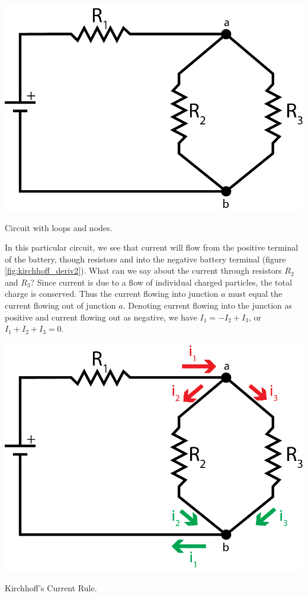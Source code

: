 \documentclass{tufte-book}
\begin{document}
\begin{marginfigure}%
  \includegraphics[width=\linewidth]{Kirchoff_I}
  \caption{Circuit with loops and nodes.}
  \label{fig:kirchhoff_deriv1}
\end{marginfigure}



In this particular circuit, we see that current will flow from the positive terminal of the battery, though resistors and into the negative battery terminal (figure \ref{fig:kirchhoff_deriv2}). What can we say about the current through resistors $R_2$ and $R_3$? Since current is due to a flow of individual charged particles, the total charge is conserved. Thus the current flowing into junction $a$ must equal the current flowing out of junction $a$. Denoting  current flowing into the junction as positive and current flowing out as negative, we have $I_1 = -I_2 + I_3$, or $I_1 + I_2 + I_3 = 0$.


\begin{marginfigure}%
  \includegraphics[width=\linewidth]{Kirchoff_III}
  \caption{Kirchhoff's Current Rule.}
  \label{fig:kirchhoff_deriv2}
\end{marginfigure}
\end{document}

